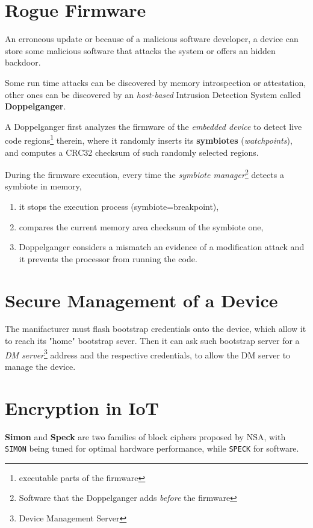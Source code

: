 \newpage
\section{Rogue Firmware}
An erroneous update or because of a malicious software developer, a device can store some malicious software that attacks the
system or offers an hidden backdoor.

Some run time attacks can be discovered by memory introspection or
attestation, other ones can be discovered by an \textit{host-based} Intrusion Detection System called \textbf{Doppelganger}.

A Doppelganger first analyzes the firmware of the \textit{embedded device} to detect
live code regions\footnote{executable parts of the firmware} therein, where it randomly
inserts its \textbf{symbiotes} (\textit{watchpoints}), and computes a CRC32 checksum of such randomly selected regions.

During the firmware execution, every time the \textit{symbiote manager}\footnote{Software that the Doppelganger adds \textit{before} the firmware} detects
a symbiote in memory,
\begin{enumerate}
   \item it stops the execution process (symbiote=breakpoint),
   \item compares the current memory area checksum of the symbiote one,
   \item Doppelganger considers a mismatch an evidence of a modification
   attack and it prevents the processor from running the code.
\end{enumerate}


\section{Secure Management of a Device}
The manifacturer must flash bootstrap credentials onto the device,
which allow it to reach its "home" bootstrap sever.
Then it can ask such bootstrap server for a \textit{DM server}\footnote{Device Management Server} address and the respective credentials,
to allow the DM server to manage the device.

\section{Encryption in IoT}
\textbf{Simon} and \textbf{Speck} are two families of block ciphers proposed by NSA,
with \texttt{SIMON} being tuned for optimal hardware performance, while \texttt{SPECK} for software.

